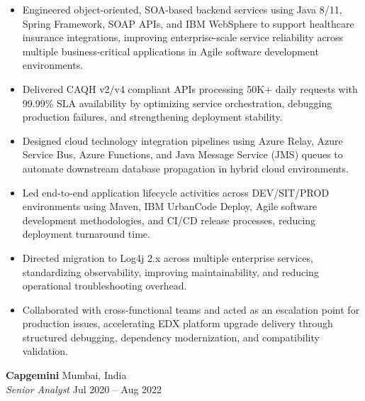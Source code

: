 \documentclass[12pt]{article}
\begin{document}
\begin{itemize}
    \item Engineered object-oriented, SOA-based backend services using Java 8/11, Spring Framework, SOAP APIs, and IBM WebSphere to support healthcare insurance integrations, improving enterprise-scale service reliability across multiple business-critical applications in Agile software development environments.
    
    \item Delivered CAQH v2/v4 compliant APIs processing 50K+ daily requests with 99.99\% SLA availability by optimizing service orchestration, debugging production failures, and strengthening deployment stability.
    
   \item Designed cloud technology integration pipelines using Azure Relay, Azure Service Bus, Azure Functions, and Java Message Service (JMS) queues to automate downstream database propagation in hybrid cloud environments.
    
    \item Led end-to-end application lifecycle activities across DEV/SIT/PROD environments using Maven, IBM UrbanCode Deploy, Agile software development methodologies, and CI/CD release processes, reducing deployment turnaround time.
    
    \item Directed migration to Log4j 2.x across multiple enterprise services, standardizing observability, improving maintainability, and reducing operational troubleshooting overhead.
    
    \item Collaborated with cross-functional teams and acted as an escalation point for production issues, accelerating EDX platform upgrade delivery through structured debugging, dependency modernization, and compatibility validation.
\end{itemize}

\textbf{Capgemini} \hfill Mumbai, India \\
\textit{Senior Analyst} \hfill Jul 2020 -- Aug 2022
\end{document}
